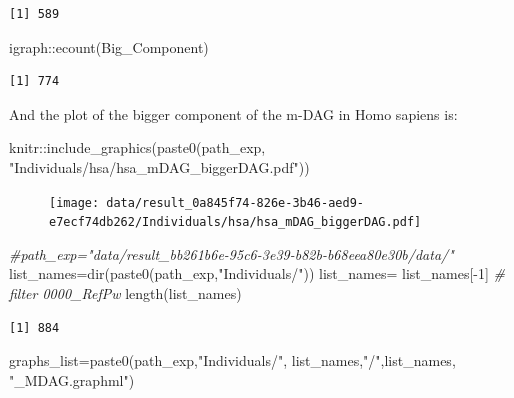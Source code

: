 \documentclass[
  letterpaper,
  DIV=11,
  numbers=noendperiod]{scrreprt}
\newenvironment{Shaded}{}{}
\newcommand{\CommentTok}[1]{\textcolor[rgb]{0.36,0.39,0.44}{\textit{#1}}}
\newcommand{\DecValTok}[1]{\textcolor[rgb]{0.82,0.60,0.40}{#1}}
\newcommand{\FunctionTok}[1]{\textcolor[rgb]{0.38,0.69,0.94}{#1}}
\newcommand{\NormalTok}[1]{\textcolor[rgb]{0.67,0.70,0.75}{#1}}
\newcommand{\OtherTok}[1]{\textcolor[rgb]{0.15,0.68,0.38}{#1}}
\newcommand{\SpecialCharTok}[1]{\textcolor[rgb]{0.34,0.71,0.76}{#1}}
\newcommand{\StringTok}[1]{\textcolor[rgb]{0.60,0.76,0.47}{#1}}
\begin{document}
\begin{verbatim}
[1] 589
\end{verbatim}

\begin{Shaded}
\begin{Highlighting}[]
\NormalTok{igraph}\SpecialCharTok{::}\FunctionTok{ecount}\NormalTok{(Big\_Component)}
\end{Highlighting}
\end{Shaded}

\begin{verbatim}
[1] 774
\end{verbatim}

And the plot of the bigger component of the m-DAG in Homo sapiens is:

\begin{Shaded}
\begin{Highlighting}[]
\NormalTok{knitr}\SpecialCharTok{::}\FunctionTok{include\_graphics}\NormalTok{(}\FunctionTok{paste0}\NormalTok{(path\_exp,}
                    \StringTok{"Individuals/hsa/hsa\_mDAG\_biggerDAG.pdf"}\NormalTok{))}
\end{Highlighting}
\end{Shaded}

\begin{figure}[H]

{\centering \texttt{[image: data/result\_0a845f74-826e-3b46-aed9-e7ecf74db262/Individuals/hsa/hsa\_mDAG\_biggerDAG.pdf]}

}

\end{figure}

\begin{Shaded}
\begin{Highlighting}[]
\CommentTok{\#path\_exp="data/result\_bb261b6e{-}95c6{-}3e39{-}b82b{-}b68eea80e30b/data/" }
\NormalTok{list\_names}\OtherTok{=}\FunctionTok{dir}\NormalTok{(}\FunctionTok{paste0}\NormalTok{(path\_exp,}\StringTok{"Individuals/"}\NormalTok{))}
\NormalTok{list\_names}\OtherTok{=}\NormalTok{ list\_names[}\SpecialCharTok{{-}}\DecValTok{1}\NormalTok{] }\CommentTok{\# filter 0000\_RefPw}
\FunctionTok{length}\NormalTok{(list\_names) }
\end{Highlighting}
\end{Shaded}

\begin{verbatim}
[1] 884
\end{verbatim}

\begin{Shaded}
\begin{Highlighting}[]
\NormalTok{graphs\_list}\OtherTok{=}\FunctionTok{paste0}\NormalTok{(path\_exp,}\StringTok{"Individuals/"}\NormalTok{, list\_names,}\StringTok{"/"}\NormalTok{,list\_names, }\StringTok{"\_MDAG.graphml"}\NormalTok{)}
\end{Highlighting}
\end{Shaded}
\end{document}
